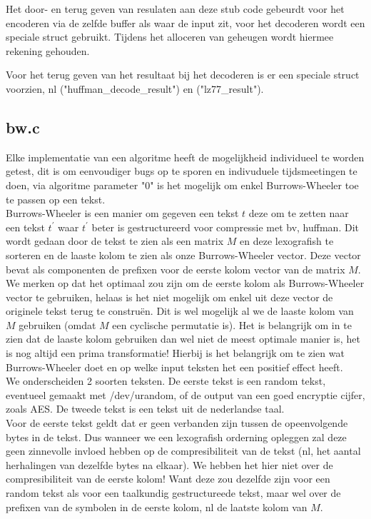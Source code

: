 \documentclass[10pt,a4paper]{report}
\begin{document}
Het door- en terug geven van resulaten aan deze stub code gebeurdt voor het encoderen via de zelfde buffer als waar de input zit, voor het decoderen wordt een speciale struct gebruikt. Tijdens het alloceren van geheugen wordt hiermee rekening gehouden.

Voor het terug geven van het resultaat bij het decoderen is er een speciale struct voorzien, nl ("huffman\_decode\_result") en ("lz77\_result"). 
\subsection*{bw.c}
Elke implementatie van een algoritme heeft de mogelijkheid individueel te worden getest, dit is om eenvoudiger bugs op te sporen en indivuduele tijdsmeetingen te doen, via algoritme parameter "0" is het mogelijk om enkel Burrows-Wheeler toe te passen op een tekst.\\

Burrows-Wheeler is een manier om gegeven een tekst $t$ deze om te zetten naar een tekst $t^{'}$ waar $t^{'}$ beter is gestructureerd voor compressie met bv, huffman. Dit wordt gedaan door de tekst te zien als een matrix $M$ en deze lexografish te sorteren en de laaste kolom te zien als onze Burrows-Wheeler vector. Deze vector bevat als componenten de prefixen voor de eerste kolom vector van de matrix $M$. We merken op dat het optimaal zou zijn om de eerste kolom als Burrows-Wheeler vector te gebruiken, helaas is het niet mogelijk om enkel uit deze vector de originele tekst terug te constru\"en. Dit is wel mogelijk al we de laaste kolom van $M$ gebruiken (omdat $M$ een cyclische permutatie is). Het is belangrijk om in te zien dat de laaste kolom gebruiken dan wel niet de meest optimale manier is, het is nog altijd een prima transformatie! Hierbij is het belangrijk om te zien wat Burrows-Wheeler doet en op welke input teksten het een positief effect heeft. \\

We onderscheiden 2 soorten teksten. De eerste tekst is een random tekst, eventueel gemaakt met /dev/urandom, of de output van een goed encryptie cijfer, zoals AES. De tweede tekst is een tekst uit de nederlandse taal. \\
Voor de eerste tekst geldt dat er geen verbanden zijn tussen de opeenvolgende bytes in de tekst. Dus wanneer we een lexografish orderning opleggen zal deze geen zinnevolle invloed hebben op de compresibiliteit van de tekst (nl, het aantal herhalingen van dezelfde bytes na elkaar). We hebben het hier niet over de compresibiliteit van de eerste kolom! Want deze zou dezelfde zijn voor een random tekst als voor een taalkundig gestructureede tekst, maar wel over de prefixen van de symbolen in de eerste kolom, nl de laatste kolom van $M$.
\end{document}
